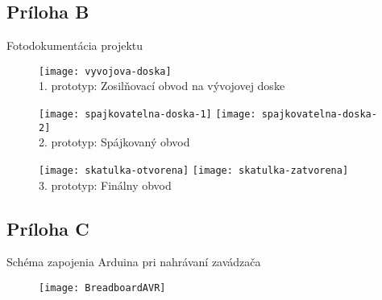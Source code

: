 \documentclass[titlepage,12pt]{article}
\begin{document}
\newpage 
\subsection*{Príloha B}
Fotodokumentácia projektu
\begin{figure}[!ht]
\begin{center}
\texttt{[image: vyvojova-doska]}
\\1. prototyp: Zosilňovací obvod na vývojovej doske
\end{center}
\end{figure}

\begin{figure}[!ht]
\begin{center}
\texttt{[image: spajkovatelna-doska-1]}
\texttt{[image: spajkovatelna-doska-2]}
\\2. prototyp: Spájkovaný obvod
\end{center}
\end{figure}

\begin{figure}[!ht]
\begin{center}
\texttt{[image: skatulka-otvorena]}
\texttt{[image: skatulka-zatvorena]}
\\3. prototyp: Finálny obvod
\end{center}
\end{figure}

\newpage
\subsection*{Príloha C}
Schéma zapojenia Arduina pri nahrávaní zavádzača
\begin{figure}[!ht]
\begin{center}
\texttt{[image: BreadboardAVR]}
\end{center}
\end{figure}
\end{document}
